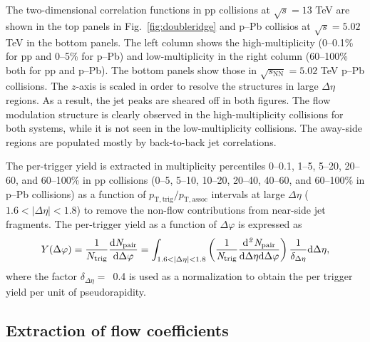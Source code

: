 The two-dimensional correlation functions in pp collisions at $\sqrt{s}=13$ TeV are shown in the top panels in Fig.~\ref{fig:doubleridge} and p--Pb collisios at $\sqrt{s}=5.02$ TeV in the bottom panels. The left column shows the high-multiplicity (0--0.1\% for pp and 0--5\% for p--Pb) and low-multiplicity in the right column (60--100\% both for pp and p--Pb). The bottom panels show those in $\sqrt{s_{\mathrm{NN}}}=5.02$ TeV p--Pb collisions. 
The $z$-axis is scaled in order to resolve the structures in large $\Delta\eta$ regions.
As a result, the jet peaks are sheared off in both figures. The flow modulation structure is clearly observed in the high-multiplicity collisions for both systems, while it is not seen in the low-multiplicity collisions. The away-side regions are populated mostly by back-to-back jet correlations. 



The per-trigger yield is extracted in multiplicity percentiles 0--0.1, 1--5, 5--20, 20--60, and 60--100\% in pp collisions (0--5, 5--10, 10--20, 20--40, 40--60, and 60--100\% in p--Pb collisions) as a function of $p_{\mathrm{T,trig}}/p_{\mathrm{T,assoc}}$ intervals at large $\Delta\eta$ ($1.6<|\Delta\eta|<1.8$) to remove the non-flow contributions from near-side jet fragments. The per-trigger yield as a function of $\Delta\varphi$ is expressed as
\begin{eqnarray}
Y(\Delta\varphi) = \frac{1}{N_{\rm{trig}}} \frac{ \rm{d}\it{}N_{\rm{pair}} }{ \rm{d}\Delta\varphi } = \int_{1.6<|\Delta \eta|<1.8} \left( \frac{1}{\it{N}_{\rm{trig}}} \frac{ \rm{d}\it{}^{2} N_{\rm{pair}} }{ \rm{d}\Delta\eta \rm{d}\Delta\varphi} \right) \dfrac{1}{\delta_{\Delta\eta}} \rm{d}\Delta \eta,
\label{eq:pertrigger}
\end{eqnarray}
where the factor $\delta_{\Delta\eta}=$~0.4 is used as a normalization to obtain the per trigger yield per unit of pseudorapidity.


\subsection{Extraction of flow coefficients}

